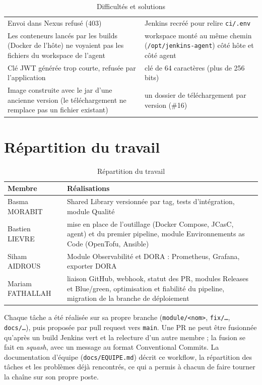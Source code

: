 \documentclass[11pt,a4paper]{report}
\begin{document}
\begin{table}[H]
\begin{tabularx}{\textwidth}{@{}YY@{}}
    Envoi dans Nexus refusé (403) & Jenkins recréé pour relire \texttt{ci/.env} \\
    \addlinespace
    Les conteneurs lancés par les builds (Docker de l'hôte) ne voyaient pas les fichiers du workspace de l'agent & workspace monté au même chemin (\texttt{/opt/jenkins-agent}) côté hôte et côté agent \\
    \addlinespace
    Clé JWT générée trop courte, refusée par l'application & clé de 64 caractères (plus de 256 bits) \\
    \addlinespace
    Image construite avec le jar d'une ancienne version (le téléchargement ne remplace pas un fichier existant) & un dossier de téléchargement par version (\#16) \\
    \bottomrule
  \end{tabularx}
  \caption{Difficultés et solutions}
\end{table}

\chapter{Répartition du travail}

\begin{table}[H]
  \centering
  \begin{tabularx}{\textwidth}{@{}lY@{}}
    \toprule
    \textbf{Membre} & \textbf{Réalisations} \\
    \midrule
    Basma MORABIT & Shared Library versionnée par tag, tests d'intégration, module Qualité \\
    Bastien LIEVRE & mise en place de l'outillage (Docker Compose, JCasC, agent) et du premier pipeline, module Environnements as Code (OpenTofu, Ansible) \\
    Siham AIDROUS & Module Observabilité et DORA : Prometheus, Grafana, exporter DORA \\
    Mariam FATHALLAH & liaison GitHub, webhook, statut des PR, modules Releases et Blue/green, optimisation et fiabilité du pipeline, migration de la branche de déploiement \\
    \bottomrule
  \end{tabularx}
  \caption{Répartition du travail}
\end{table}

Chaque tâche a été réalisée sur sa propre branche (\texttt{module/<nom>}, \texttt{fix/\ldots}, \texttt{docs/\ldots}), puis proposée par pull request vers \texttt{main}. Une PR ne peut être fusionnée qu'après un build Jenkins vert et la relecture d'un autre membre ; la fusion se fait en \emph{squash}, avec un message au format Conventional Commits. La documentation d'équipe (\texttt{docs/EQUIPE.md}) décrit ce workflow, la répartition des tâches et les problèmes déjà rencontrés, ce qui a permis à chacun de faire tourner la chaîne sur son propre poste.
\end{document}
